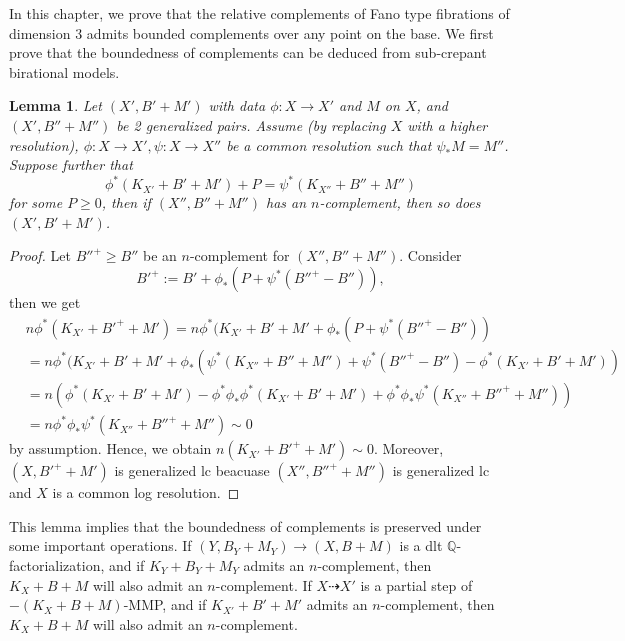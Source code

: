 \documentclass[letterpaper,reqno,12pt]{amsart}
\numberwithin{equation}{section}
\theoremstyle{plain}
\newtheorem{lemma}[theorem]{Lemma}
\begin{document}
In this chapter, we prove that the relative complements of Fano type fibrations of dimension $3$ admits bounded complements over any point on the base. We first prove that the boundedness of complements can be deduced from sub-crepant birational models.
    \begin{lemma}
    \label{subcrep}
        Let $(X',B' + M')$ with data $\phi:X\to X'$ and $M$ on $X$, and $(X',B'' + M'')$ be 2 generalized pairs. Assume (by replacing $X$ with a higher resolution), $\phi:X\to X',\psi:X\to X''$ be a common resolution such that $\psi_*M = M''$. Suppose further that \[\phi^*(K_{X'} + B' +M') + P = \psi^*(K_{X''} + B'' +M'')\] for some $P \geq 0$, then if $(X'',B'' +M'')$ has an $n$-complement, then so does $(X',B' +M')$.
    \end{lemma}
    \begin{proof}
        Let $B''^+\geq B''$ be an $n$-complement for $(X'',B'' + M'')$. Consider \[B'^+ := B' + \phi_*(P + \psi^*(B''^+-B'')),\] then we get \[\begin{aligned}&n\phi^*(K_{X'} + B'^+ +M') = n\phi^*(K_{X'} + B' +M'+\phi_*(P + \psi^*(B''^+- B'') )\\&=n\phi^*(K_{X'} + B' +M'+\phi_*(\psi^*(K_{X''} + B'' +M'') + \psi^*(B''^+- B'')- \phi^*(K_{X'} + B' +M'))\\&=n(\phi^*(K_{X'} + B' +M')-\phi^*\phi_*\phi^*(K_{X'} + B' +M')+\phi^*\phi_*\psi^*(K_{X''} + B''^+ +M''))\\&=n\phi^*\phi_*\psi^*(K_{X''} + B''^+ +M'')\sim 0\end{aligned}\] by assumption. Hence, we obtain $n(K_{X'} + B'^+ +M')\sim0$. Moreover, $(X, B'^+ +M')$ is generalized lc  beacuase $(X'',B''^+ +M'')$ is generalized lc and $X$ is a common log resolution.
    \end{proof}
This lemma implies that the boundedness of complements is preserved under some important operations. If $(Y,B_Y+M_Y)\to (X,B+M)$ is a dlt ${\mathbb Q}$-factorialization, and if  $K_Y+B_Y+M_Y$ admits an $n$-complement, then $K_X+B+M$ will also admit an $n$-complement. If $X\dashrightarrow  X'$ is a partial step of $-(K_X+B+M)$-MMP, and if $K_{X'}+B'+M'$ admits an $n$-complement, then  $K_X+B+M$ will also admit an $n$-complement.
\end{document}
